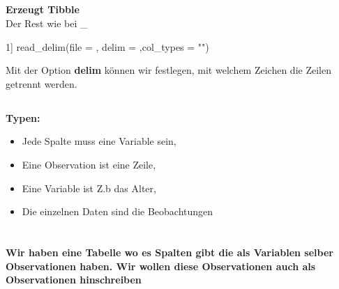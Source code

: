\subsection{}
\textbf{Erzeugt Tibble}\\
Der Rest wie bei \_
\begin{rcode}{1]}
read_delim(file = , delim = ,col_types = "")
\end{rcode}
Mit der Option \textbf{delim} können wir festlegen, mit welchem Zeichen die Zeilen getrennt werden. 
\columnbreak
\subsection{}
\textbf{Typen:}
\begin{itemize}[noitemsep]
  \item Jede Spalte muss eine Variable sein,
  \item Eine Observation ist eine Zeile,
  \item Eine Variable ist Z.b das Alter,
  \item Die einzelnen Daten sind die Beobachtungen
\end{itemize}

\normalsize
\section{}
\subsection{}
\textbf{Wir haben eine Tabelle wo es Spalten gibt die als Variablen selber Observationen haben. Wir wollen diese Observationen auch als Observationen hinschreiben}\\

